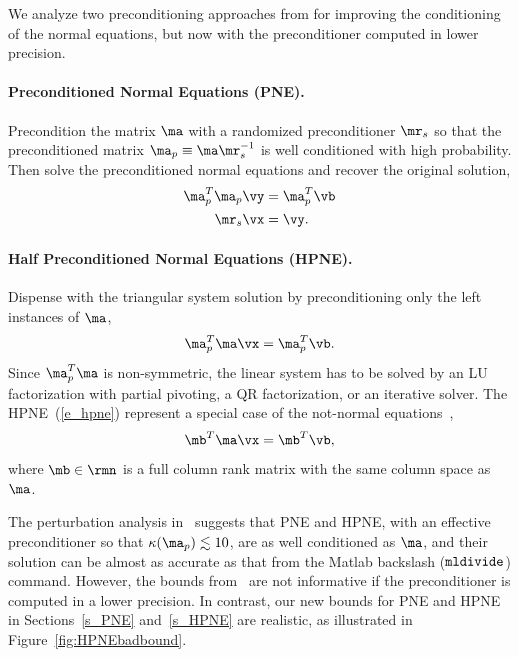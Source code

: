 \documentclass[final]{siamart220329}%
\begin{document}
We analyze two preconditioning approaches from \cite{ipsen2025solutionsquaresproblemsrandomized}
for improving the conditioning of the normal equations, but now with the preconditioner computed in lower precision.
 
 
\paragraph{Preconditioned Normal Equations  (PNE). }
Precondition the matrix $\ma$  with a randomized preconditioner $\mr_s$ so that the preconditioned matrix 
$\ma_p\equiv \ma\mr_s^{-1}$ is well conditioned
with high probability. Then solve the preconditioned normal equations and recover the original solution,
\begin{equation}
\begin{split}
\ma_p^T\ma_p\vy&=\ma_p^T\vb\\\label{e_pne}
\mr_s\vx&=\vy.
\end{split}
\end{equation}

\paragraph{Half Preconditioned Normal Equations (HPNE).}
Dispense with the triangular system solution by preconditioning only the left instances of $\ma$,
\begin{align}\label{e_hpne}
\ma_p^T\ma\vx=\ma_p^T\vb.
\end{align}
Since $\ma_p^T\ma$ is non-symmetric, the linear system 
has to be solved by an LU factorization
with partial pivoting, a QR factorization, or an iterative solver. 
The HPNE~(\ref{e_hpne}) represent a special case of the not-normal equations~\cite{Wathennotnormal},
\begin{equation*}
    \mb^T\ma\vx=\mb^T\vb,
\end{equation*}
where $\mb\in\rmn$ is a full column rank matrix with the same column space as $\ma$. 


The perturbation analysis in~\cite{ipsen2025solutionsquaresproblemsrandomized} suggests that PNE and HPNE, with an effective preconditioner so that $\kappa(\ma_p)\lesssim10$, are as well conditioned as $\ma$, and 
their solution can be almost as accurate as that from the Matlab backslash ($\verb|mldivide|$) command. However, the bounds
from~\cite{ipsen2025solutionsquaresproblemsrandomized}
are not informative if the preconditioner is computed in a lower precision. In contrast, our new bounds for PNE and HPNE in Sections~\ref{s_PNE} and~\ref{s_HPNE} are realistic, as illustrated in Figure~\ref{fig:HPNEbadbound}.
\end{document}
